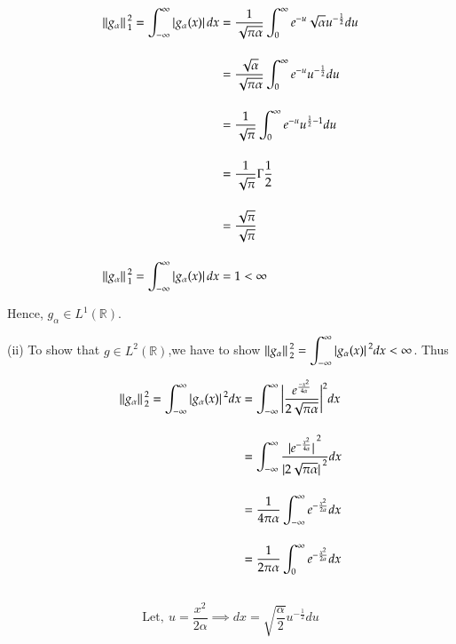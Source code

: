 \documentclass[12pt, a4paper]{article} %
\begin{document}
\begin{equation*}
    \begin{split}
        \norm*{g_{\alpha}}_1^2 = \int_{-\infty}^{\infty}\abs*{g_{\alpha} (x)}dx & = \frac{1}{\sqrt{\pi \alpha}}\int_{0}^{\infty}e^{-u}\sqrt{\alpha}u^{-\frac{1}{2}}du\\[4mm]
        & = \frac{\sqrt{\alpha}}{\sqrt{\pi \alpha}}\int_{0}^{\infty}e^{-u} u^{-\frac{1}{2}}du\\[4mm]
        & = \frac{1}{\sqrt{\pi}}\int_{0}^{\infty}e^{-u} u^{\frac{1}{2}-1}du\\[4mm]
        & = \frac{1}{\sqrt{\pi}}\Gamma\frac{1}{2}\\[4mm]
        & = \frac{\sqrt{\pi}}{\sqrt{\pi}}\\[4mm]
        \norm*{g_{\alpha}}_1^2 = \int_{-\infty}^{\infty}\abs*{g_{\alpha} (x)}dx & = 1< \infty
    \end{split}
\end{equation*}

Hence, $g_\alpha \in L^1(\mathbb{R})$.
\pagebreak

(ii) To show that $g\in L^2(\mathbb{R})$,we have to show $\displaystyle \norm*{g_{\alpha}}_2^2 = \int_{-\infty}^{\infty}\abs*{g_{\alpha} (x)}^2dx  < \infty$. Thus 

\BgThispage
\begin{equation*}
    \begin{split}
        \norm*{g_{\alpha}}_2^2 = \int_{-\infty}^{\infty}\abs*{g_{\alpha} (x)}^2 dx & = \int_{-\infty}^{\infty}\bigg|\frac{e^{\frac{-x^2}{4\alpha}}}{2\sqrt{\pi \alpha}}\bigg|^2 dx\\[4mm]
        & = \int_{-\infty}^{\infty}\frac{\abs*{e^{-\frac{x^2}{4\alpha}}}^2}{\abs*{2\sqrt{\pi \alpha}}^2}dx\\[4mm]
        & = \frac{1}{4\pi \alpha}\int_{-\infty}^{\infty}e^{-\frac{x^2}{2\alpha}}dx\\[4mm]
        & = \frac{1}{2\pi \alpha}\int_{0}^{\infty}e^{-\frac{x^2}{2\alpha}}dx\\[4mm]
    \end{split}
\end{equation*}

\[\boxed{\mbox{Let},\ u = \frac{x^2}{2\alpha} \implies dx = \sqrt{\frac{\alpha}{2}}u^{-\frac{1}{2}}du}\]
\end{document}
